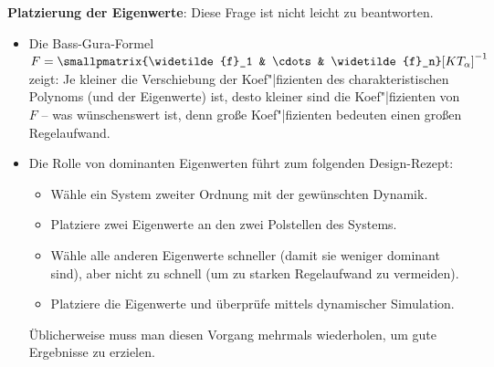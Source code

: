\linie

\textbf{Platzierung der Eigenwerte}:
Diese Frage ist nicht leicht zu beantworten.
\begin{itemize}
    \item
    Die Bass-Gura-Formel
    $F = \smallpmatrix{\widetilde{f}_1 & \cdots & \widetilde{f}_n} [K T_\alpha]^{-1}$
    zeigt:
    Je kleiner die Verschiebung der Koef"|fizienten des charakteristischen Polynoms
    (und der Eigenwerte) ist, desto kleiner sind die Koef"|fizienten von $F$ --
    was wünschenswert ist, denn große Koef"|fizienten bedeuten einen großen Regelaufwand.

    \item
    Die Rolle von dominanten Eigenwerten führt zum folgenden Design-Rezept:
    \begin{itemize}
        \item
        Wähle ein System zweiter Ordnung mit der gewünschten Dynamik.

        \item
        Platziere zwei Eigenwerte an den zwei Polstellen des Systems.

        \item
        Wähle alle anderen Eigenwerte schneller (damit sie weniger dominant sind),
        aber nicht zu schnell (um zu starken Regelaufwand zu vermeiden).

        \item
        Platziere die Eigenwerte und überprüfe mittels dynamischer Simulation.
    \end{itemize}
    Üblicherweise muss man diesen Vorgang mehrmals wiederholen,
    um gute Ergebnisse zu erzielen.
\end{itemize}

\pagebreak
